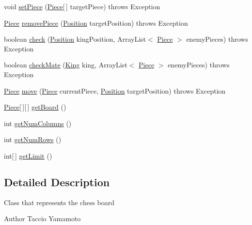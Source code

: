 \begin{DoxyCompactItemize}
\item 
void \hyperlink{classBoard_1_1Board_ad7f93562756cf2704b53d660d8c2ef12}{set\-Piece} (\hyperlink{classPiece_1_1Piece}{Piece}\mbox{[}$\,$\mbox{]} target\-Piece)  throws Exception 
\item 
\hyperlink{classPiece_1_1Piece}{Piece} \hyperlink{classBoard_1_1Board_a31788b52f6230f37b2c68e274c62f1e7}{remove\-Piece} (\hyperlink{classUtil_1_1Position}{Position} target\-Position)  throws Exception 
\item 
boolean \hyperlink{classBoard_1_1Board_abf4d033c7753e614381a9276ee29fc62}{check} (\hyperlink{classUtil_1_1Position}{Position} king\-Position, Array\-List$<$ \hyperlink{classPiece_1_1Piece}{Piece} $>$ enemy\-Pieces)  throws Exception 
\item 
boolean \hyperlink{classBoard_1_1Board_a713aad08cb0666bf632cf2cf3447124f}{check\-Mate} (\hyperlink{classPiece_1_1Implementation_1_1King}{King} king, Array\-List$<$ \hyperlink{classPiece_1_1Piece}{Piece} $>$ enemy\-Pieces)  throws Exception 
\item 
\hyperlink{classPiece_1_1Piece}{Piece} \hyperlink{classBoard_1_1Board_a0950d74ea65b9e01a5a2169815e486d9}{move} (\hyperlink{classPiece_1_1Piece}{Piece} current\-Piece, \hyperlink{classUtil_1_1Position}{Position} target\-Position)  throws Exception 
\item 
\hyperlink{classPiece_1_1Piece}{Piece}\mbox{[}$\,$\mbox{]}\mbox{[}$\,$\mbox{]} \hyperlink{classBoard_1_1Board_ac153f5c0e83be18cec93e33078706076}{get\-Board} ()
\item 
int \hyperlink{classBoard_1_1Board_a98f46a8fba5082f562248f650f26c2ed}{get\-Num\-Columns} ()
\item 
int \hyperlink{classBoard_1_1Board_a25c2073838801fb0e52bd3916d7a9024}{get\-Num\-Rows} ()
\item 
int\mbox{[}$\,$\mbox{]} \hyperlink{classBoard_1_1Board_a491bcebbe369da000b951e706910f5bd}{get\-Limit} ()
\end{DoxyCompactItemize}


\subsection{Detailed Description}
Class that represents the chess board

\begin{DoxyAuthor}{Author}
Taccio Yamamoto 
\end{DoxyAuthor}


